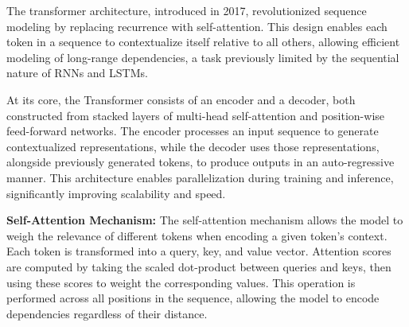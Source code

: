\documentclass[12pt,twoside]{report}
\begin{document}

The transformer architecture, introduced in 2017, revolutionized sequence modeling by replacing recurrence with self-attention. This design enables each token in a sequence to contextualize itself relative to all others, allowing efficient modeling of long-range dependencies, a task previously limited by the sequential nature of RNNs and LSTMs.

At its core, the Transformer consists of an encoder and a decoder, both constructed from stacked layers of multi-head self-attention and position-wise feed-forward networks. The encoder processes an input sequence to generate contextualized representations, while the decoder uses those representations, alongside previously generated tokens, to produce outputs in an auto-regressive manner. This architecture enables parallelization during training and inference, significantly improving scalability and speed.

\textbf{Self-Attention Mechanism:}
The self-attention mechanism allows the model to weigh the relevance of different tokens when encoding a given token's context. Each token is transformed into a query, key, and value vector. Attention scores are computed by taking the scaled dot-product between queries and keys, then using these scores to weight the corresponding values. This operation is performed across all positions in the sequence, allowing the model to encode dependencies regardless of their distance.
\end{document}
